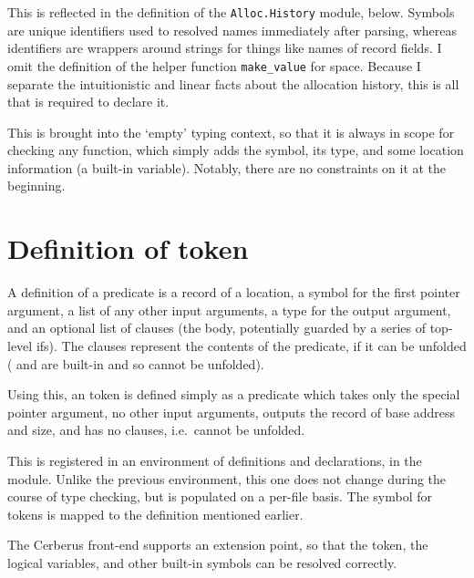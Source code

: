 This is reflected in the definition of the \texttt{Alloc.History}
module, below. Symbols are unique identifiers used to resolved names
immediately after parsing, whereas identifiers are wrappers around strings for
things like names of record fields. I omit the definition of the helper function
\texttt{make_value} for space. Because I separate the intuitionistic
and linear facts about the allocation history, this is all that is required to
declare it.


This is brought into the `empty' typing context, so that it is always in scope
for checking any function, which simply adds the symbol, its type, and some
location information (a built-in variable). Notably, there are no constraints
on it at the beginning.


\section{Definition of  token}

A definition of a predicate is a record of a location, a symbol for the first
pointer argument, a list of any other input arguments, a type for the output
argument, and an optional list of clauses (the body, potentially guarded by a
series of top-level ifs). The clauses represent the contents of the predicate,
if it can be unfolded ( and  are built-in and
so cannot be unfolded).


Using this, an  token is defined simply as a predicate which
takes only the special pointer argument, no other input arguments, outputs the
record of base address and size, and has no clauses, i.e.\ cannot be unfolded.


This is registered in an environment of definitions and declarations, in the
 module. Unlike the previous environment, this one does not
change during the course of type checking, but is populated on a per-file
basis. The symbol for  tokens is mapped to the definition
mentioned earlier.


The Cerberus front-end supports an extension point, so that the
 token, the  logical variables, and other
built-in symbols can be resolved correctly.

